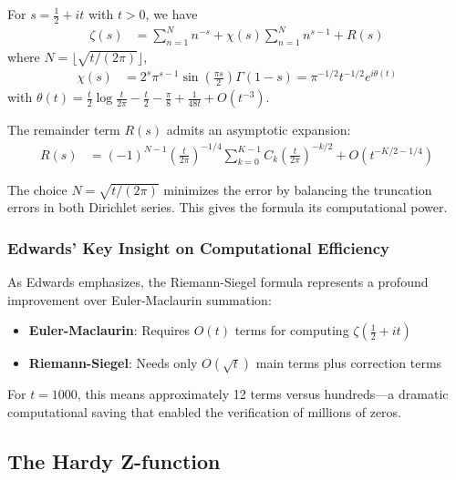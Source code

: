 \begin{theorem}
For $s = \frac{1}{2} + it$ with $t > 0$, we have
\begin{align}
\zeta(s) &= \sum_{n=1}^{N} n^{-s} + \chi(s) \sum_{n=1}^{N} n^{s-1} + R(s)
\end{align}
where $N = \lfloor\sqrt{t/(2\pi)}\rfloor$, 
\begin{align}
\chi(s) &= 2^s \pi^{s-1} \sin\left(\frac{\pi s}{2}\right) \Gamma(1-s) = \pi^{-1/2} t^{-1/2} e^{i\theta(t)}
\end{align}
with $\theta(t) = \frac{t}{2}\log\frac{t}{2\pi} - \frac{t}{2} - \frac{\pi}{8} + \frac{1}{48t} + O(t^{-3})$.
\end{theorem}

The remainder term $R(s)$ admits an asymptotic expansion:
\begin{align}
R(s) &= (-1)^{N-1} \left(\frac{t}{2\pi}\right)^{-1/4} \sum_{k=0}^{K-1} C_k \left(\frac{t}{2\pi}\right)^{-k/2} + O(t^{-K/2-1/4})
\end{align}

\begin{remark}
The choice $N = \sqrt{t/(2\pi)}$ minimizes the error by balancing the truncation errors in both Dirichlet series. This gives the formula its computational power.
\end{remark}

\subsubsection{Edwards' Key Insight on Computational Efficiency}

As Edwards \cite{edwards1974} emphasizes, the Riemann-Siegel formula represents a profound improvement over Euler-Maclaurin summation:

\begin{itemize}
\item \textbf{Euler-Maclaurin}: Requires $O(t)$ terms for computing $\zeta(\frac{1}{2} + it)$
\item \textbf{Riemann-Siegel}: Needs only $O(\sqrt{t})$ main terms plus correction terms
\end{itemize}

For $t = 1000$, this means approximately 12 terms versus hundreds---a dramatic computational saving that enabled the verification of millions of zeros.

\subsection{The Hardy Z-function}

